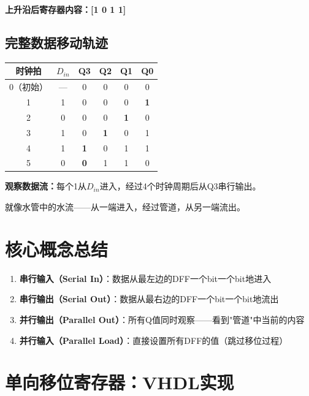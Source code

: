 \textbf{上升沿后寄存器内容：[1 0 1 1]}

\subsection{完整数据移动轨迹}

\begin{center}
\begin{tabular}{|c|c|c|c|c|c|}
\hline
\textbf{时钟拍} & \textbf{$D_{in}$} & \textbf{Q3} & \textbf{Q2} & \textbf{Q1} & \textbf{Q0} \\
\hline
0（初始）& — & 0 & 0 & 0 & 0 \\
1 & 1 & 0 & 0 & 0 & \textbf{1} \\
2 & 0 & 0 & 0 & \textbf{1} & 0 \\
3 & 1 & 0 & \textbf{1} & 0 & 1 \\
4 & 1 & \textbf{1} & 0 & 1 & 1 \\
5 & 0 & \textbf{0} & 1 & 1 & 0 \\
\hline
\end{tabular}
\end{center}

\textbf{观察数据流：}每个1从$D_{in}$进入，经过4个时钟周期后从Q3串行输出。

就像水管中的水流——从一端进入，经过管道，从另一端流出。

\section{核心概念总结}

\begin{enumerate}
  \item \textbf{串行输入（Serial In）}：数据从最左边的DFF一个bit一个bit地进入
  \item \textbf{串行输出（Serial Out）}：数据从最右边的DFF一个bit一个bit地流出
  \item \textbf{并行输出（Parallel Out）}：所有Q值同时观察——看到"管道"中当前的内容
  \item \textbf{并行输入（Parallel Load）}：直接设置所有DFF的值（跳过移位过程）
\end{enumerate}

\section{单向移位寄存器：VHDL实现}

